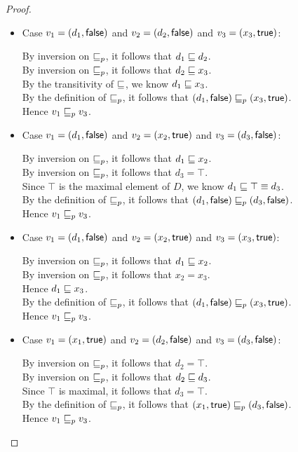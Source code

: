 \begin{proof}
\begin{enumerate}
\begin{enumerate}
\begin{itemize}
  \item Case $v_1 = (d_1, \textsf{false})$ and $v_2 = (d_2, \textsf{false})$ and $v_3 = (x_3, \textsf{true})$:

    By inversion on $\sqsubseteq_p$, it follows that $d_1 \sqsubseteq d_2$. \\ 
    By inversion on $\sqsubseteq_p$, it follows that $d_2 \sqsubseteq x_3$. \\ 
    By the transitivity of $\sqsubseteq$, we know $d_1 \sqsubseteq x_3$. \\ 
    By the definition of $\sqsubseteq_p$, it follows that $(d_1, \textsf{false}) \sqsubseteq_p (x_3, \textsf{true})$. \\ 
    Hence $v_1 \sqsubseteq_p v_3$. 

  \item Case $v_1 = (d_1, \textsf{false})$ and $v_2 = (x_2, \textsf{true})$ and $v_3 = (d_3, \textsf{false})$:

    By inversion on $\sqsubseteq_p$, it follows that $d_1 \sqsubseteq x_2$. \\ 
    By inversion on $\sqsubseteq_p$, it follows that $d_3 = \top$. \\ 
    Since $\top$ is the maximal element of $D$, we know $d_1 \sqsubseteq \top \equiv d_3$. \\ 
    By the definition of $\sqsubseteq_p$, it follows that $(d_1, \textsf{false}) \sqsubseteq_p (d_3, \textsf{false})$. \\ 
    Hence $v_1 \sqsubseteq_p v_3$. 

  \item Case $v_1 = (d_1, \textsf{false})$ and $v_2 = (x_2, \textsf{true})$ and $v_3 = (x_3, \textsf{true})$:

    By inversion on $\sqsubseteq_p$, it follows that $d_1 \sqsubseteq x_2$. \\ 
    By inversion on $\sqsubseteq_p$, it follows that $x_2 = x_3$. \\ 
    Hence $d_1 \sqsubseteq x_3$. \\ 
    By the definition of $\sqsubseteq_p$, it follows that $(d_1, \textsf{false}) \sqsubseteq_p (x_3, \textsf{true})$. \\ 
    Hence $v_1 \sqsubseteq_p v_3$. 

  \item Case $v_1 = (x_1, \textsf{true})$ and $v_2 = (d_2, \textsf{false})$ and $v_3 = (d_3, \textsf{false})$:

    By inversion on $\sqsubseteq_p$, it follows that $d_2 = \top$. \\ 
    By inversion on $\sqsubseteq_p$, it follows that $d_2 \sqsubseteq d_3$. \\ 
    Since $\top$ is maximal, it follows that $d_3 = \top$. \\ 
    By the definition of $\sqsubseteq_p$, it follows that $(x_1, \textsf{true}) \sqsubseteq_p (d_3, \textsf{false})$. \\ 
    Hence $v_1 \sqsubseteq_p v_3$. 


\end{itemize}
\end{enumerate}
\end{enumerate}
\end{proof}
